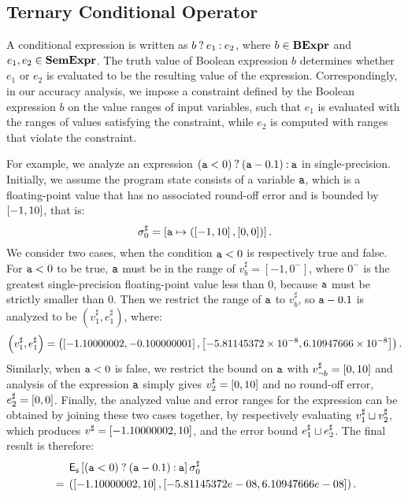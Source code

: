 \subsection{Ternary Conditional Operator}

A conditional expression is written as $b\mathbin{?} e_1\mathbin{:} e_2$, where $b
\in \mathbf{BExpr}$ and $e_1, e_2 \in \mathbf{SemExpr}$.  The truth value of Boolean
expression $b$ determines whether $e_1$ or $e_2$ is evaluated to be the
resulting value of the expression.  Correspondingly, in our accuracy analysis,
we impose a constraint defined by the Boolean expression $b$ on the value
ranges of input variables, such that $e_1$ is evaluated with the ranges of
values satisfying the constraint, while $e_2$ is computed with ranges that
violate the constraint.

For example, we analyze an expression $(\texttt{a} < 0)\mathbin{?}(\texttt{a} -
0.1)\mathbin{:}\texttt{a}$ in single-precision.  Initially, we assume the program state
consists of a variable $\texttt{a}$, which is a floating-point value that has no
associated round-off error and is bounded by $\left[{-1}, {10}\right]$, that is:
\begin{equation}
    \sigma^\sharp_0 = \left[
        \texttt{a} \mapsto \left(
            \left[{-1}, {10}\right],
            \left[{0}, {0}\right]
        \right)
    \right].
\end{equation}
We consider two cases, when the condition $\texttt{a} < 0$ is respectively true and
false.  For $\texttt{a} < 0$ to be true, $\texttt{a}$ must be in the range of $v^\sharp_b
= [-1, 0^{-}]$, where $0^{-}$ is the greatest single-precision floating-point
value less than 0, because $\texttt{a}$ must be strictly smaller than $0$.  Then we
restrict the range of $\texttt{a}$ to $v^\sharp_b$, so $\texttt{a} - 0.1$ is analyzed to
be $(v^\sharp_1, e^\sharp_1)$, where:
\begin{equation}
    \left( v^\sharp_1, e^\sharp_1 \right) = \left(
        \left[{-1.10000002}, {-0.100000001}\right],
        \left[{-5.81145372\times10^{-8}}, {6.10947666\times10^{-8}}\right]
    \right).
\end{equation}
Similarly, when $\texttt{a} < 0$ is false, we restrict the bound on $\texttt{a}$
with $v^\sharp_{\neg b} = \left[{0}, {10}\right]$ and analysis of the expression
$\texttt{a}$ simply gives $v^\sharp_2 = \left[{0}, {10}\right]$ and no round-off error,
$e^\sharp_2 = \left[{0}, {0}\right]$.  Finally, the analyzed value and error ranges
for the expression can be obtained by joining these two cases together,
by respectively evaluating $v^\sharp_1 \sqcup v^\sharp_2$, which produces
$v^\sharp = \left[{-1.10000002}, {10}\right]$, and the error bound $e^\sharp_1 \sqcup
e^\sharp_2$.  The final result is therefore:
\begin{equation}
    \begin{aligned}
        & \operatorname{\mathsf{E}_\mathsf{s}}\left[{
            \left(\texttt{a} < 0\right)\mathbin{?}\left(\texttt{a} - 0.1\right)\mathbin{:}\texttt{a}
        }\right]{\sigma^\sharp_0} \\
        {}={} & \left(
            \left[{-1.10000002}, {10}\right],
            \left[{-5.81145372e-08}, {6.10947666e-08}\right]
        \right).
    \end{aligned}
\end{equation}

